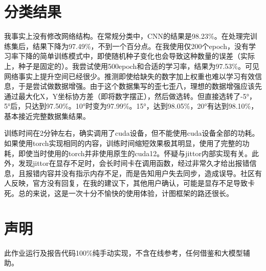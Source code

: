 \documentclass[a4paper]{article}
\begin{document}
	\section*{分类结果}
	我事实上没有修改网络结构。在常规分类中，CNN的结果是98.23\%。在处理完训练集后，结果下降为97.49\%，不到一个百分点。在我使用仅200个epoch，没有学习率下降的简单训练模式中，即使随机种子变化也会导致这种数量的误差（实际上，种子是固定的）。我尝试使用500epoch和合适的学习率，结果为97.53\%。可见网络事实上提升空间已经很少。推测即使给缺失的数字加上权重也难以学习有效信息，于是尝试做数据增强。由于这个数据集写的歪七歪八，理想的数据增强应该先通过最大化X，Y坐标协方差（即将数字摆正），然后做选转。但直接选转了-5°，5°后，只达到97.50\%。10°时变为97.99\%。15°，达到98.05\%，20°有达到98.10\%，基本接近完整数据集结果。
	
	训练时间在2分钟左右，确实调用了cuda设备，但不能使用cuda设备全部的功耗。如果使用torch实现相同的内容，训练时间缩短效果极其明显，使用了完整的功耗，即使当时使用的torch并非使用原生的cuda12。怀疑与jittor内部实现有关。此外，发现jittor在显存不足时，会长时间卡在调用函数，经过非常久才给出报错信息，且报错内容并没有指示内存不足，而是告知用户失去同步，造成误导。社区有人反映，官方没有回复，在我的建议下，其他用户确认，可能是显存不足导致卡死。总的来说，这是一次十分不愉快的使用体验，计图框架的路还很长。
	\section*{声明}
	此作业运行及报告代码100\%纯手动实现，不含在线参考，任何借鉴和大模型辅助。
\end{document}
